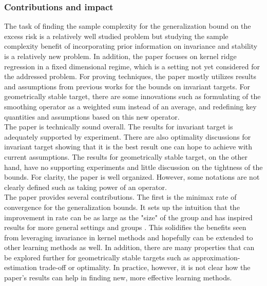 \subsubsection{Contributions and impact}
The task of finding the sample complexity for the generalization bound on the excess risk is a relatively well studied problem but studying the sample complexity benefit of incorporating prior information on invariance and stability is a relatively new problem. In addition, the paper focuses on kernel ridge regression in a fixed dimensional regime, which is a setting not yet considered for the addressed problem. For proving techniques, the paper mostly utilizes results and assumptions from previous works for the bounds on invariant targets. For geometrically stable target, there are some innovations such as formulating of the smoothing operator as a weighted sum instead of an average, and redefining key quantities and assumptions based on this new operator.\\
The paper is technically sound overall. The results for invariant target is adequately supported by experiment. There are also optimality discussions for invariant target showing that it is the best result one can hope to achieve with current assumptions. The results for geometrically stable target, on the other hand, have no supporting experiments and little discussion on the tightness of the bounds. For clarity, the paper is well organized. However, some notations are not clearly defined such as taking power of an operator.\\
The paper provides several contributions. The first is the minimax rate of convergence for the generalization bounds. It sets up the intuition that the improvement in rate can be as large as the "size" of the group and has inspired results for more general settings and groups \cite{tahmasebi2023exact}. This solidifies the benefits seen from leveraging invariance in kernel methods and hopefully can be extended to other learning methods as well. In addition, there are many properties that can be explored further for geometrically stable targets such as approximation-estimation trade-off or optimality. In practice, however, it is not clear how the paper's results can help in finding new, more effective learning methods.